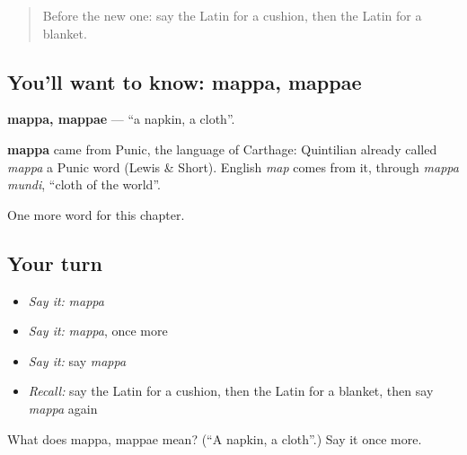 \label{lesson:LA-C120-mappa}



\begin{quote}
Before the new one: say the Latin for a cushion, then the Latin for a blanket.
\end{quote}

\subsection*{You'll want to know: mappa, mappae}
\textbf{mappa, mappae} — \textquotedblleft{}a napkin, a cloth\textquotedblright{}.

\begin{cousinweb}
\textbf{mappa} came from Punic, the language of Carthage: Quintilian already called \emph{mappa} a Punic word (Lewis \& Short). English \emph{map} comes from it, through \emph{mappa mundi}, \textquotedblleft{}cloth of the world\textquotedblright{}.
\end{cousinweb}

\begin{grammarlens}[title={What you've built}]
One more word for this chapter.
\end{grammarlens}

\subsection*{Your turn}
\begin{itemize}
\raggedright
  \item \emph{Say it:} \emph{mappa}
  \item \emph{Say it:} \emph{mappa}, once more
  \item \emph{Say it:} say \emph{mappa}
  \item \emph{Recall:} say the Latin for a cushion, then the Latin for a blanket, then say \emph{mappa} again
\end{itemize}

\begin{tcolorbox}[breakable,colback=teal!4,colframe=teal!35!black,title={Before you move on}]
What does mappa, mappae mean? (\textquotedblleft{}A napkin, a cloth\textquotedblright{}.) Say it once more.
\end{tcolorbox}
